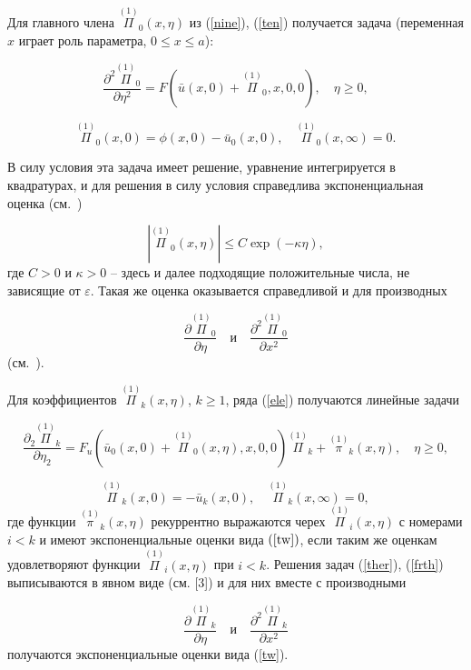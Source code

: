 \documentclass[12pt]{article}
\newcommand{\RNumb}[1]{\uppercase\expandafter{\romannumeral #1\relax}}
\begin{document}
Для главного члена  $\overset{(1)}{\Pi}_{0}  (x,\eta)$ из (\ref{nine}), (\ref{ten}) получается задача (переменная $x$ играет роль параметра, $0 \leq x \leq a$):
 
$$  \frac {\partial ^{2} \overset{(1)}{\Pi}_{0}}{\partial \eta ^{2}} = F \left(\bar u(x,0) + \overset{(1)}{\Pi}_{0}, x, 0, 0 \right), \quad \eta \geq 0, $$

$$  \overset{(1)}{\Pi}_{0}(x, 0) = \phi(x,0) - \bar u_{0}(x,0), \quad \overset{(1)}{\Pi}_{0}(x,\infty) = 0.  $$

В силу условия \RNumb{4} эта задача имеет решение, уравнение интегрируется в квадратурах, и для решения в силу условия \RNumb{3} справедлива экспоненциальная оценка (см.~\cite{vasilieva})

\begin{equation} \label{tw} \left|\overset{(1)}{\Pi}_{0}(x, \eta) \right| \leq C \exp(-\kappa \eta), \end{equation}
где $C > 0$ и $\kappa > 0$ -- здесь и далее подходящие положительные числа, не зависящие от $\varepsilon$. Такая же оценка оказывается справедливой и для производных

$$ \frac {\partial \overset{(1)}{\Pi}_{0}}{\partial \eta} \quad \text{и}\quad \frac {\partial^{2}\overset{(1)}{\Pi}_{0}}{\partial x^{2}}$$
(см.~\cite{butuzov}).

Для коэффициентов $\overset{(1)}{\Pi}_{k}(x, \eta)$, $k \geq 1$, ряда (\ref{ele}) получаются линейные задачи

\begin{equation} \label{ther} \frac {\partial_{2} \overset{(1)}{\Pi}_{k}}{\partial \eta_{2}} = F_{u} \left(\bar u_{0}(x,0) + \overset{(1)}{\Pi}_{0}(x, \eta), x, 0, 0 \right) \overset{(1)}{\Pi}_{k} + \overset{(1)}{\pi}_{k} (x, \eta), \quad \eta \geq 0, \end{equation}

\begin{equation}\label{frth} 
\overset{(1)}{\Pi}_{k}(x, 0) = -\bar u_{k}(x, 0), \quad  \overset{(1)}{\Pi}_{k}(x, \infty) = 0, \end{equation}
где функции $\overset{(1)}{\pi}_{k}(x, \eta)$ рекуррентно выражаются черех $\overset{(1)}{\Pi}_{i}(x, \eta)$ с номерами $i < k$ и имеют экспоненциальные оценки вида $(\ref{tw})$, если таким же оценкам удовлетворяют функции $\overset{(1)}{\Pi}_{i}(x, \eta)$ при $i < k$. Решения задач (\ref{ther}), (\ref{frth}) выписываются в явном виде (см. [3]) и для них вместе с производными

$$ \frac {\partial \overset{(1)}{\Pi}_{k}}{\partial \eta} \quad \text{и}\quad \frac {\partial^{2}\overset{(1)}{\Pi}_{k}}{\partial x^{2}}$$
получаются экспоненциальные оценки вида (\ref{tw}).
\end{document}
